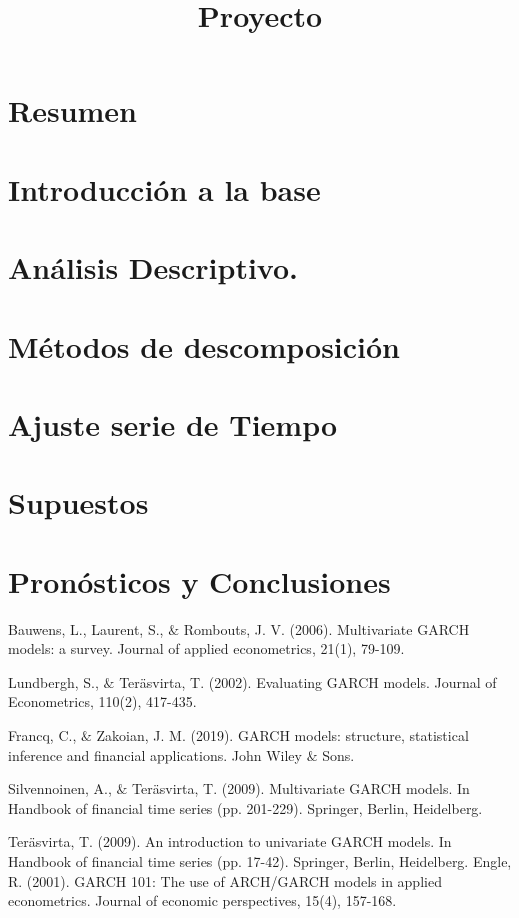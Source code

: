 \documentclass{article}
\title{Proyecto}
\begin{document}

\tableofcontents
\newpage

\section{Resumen}


\section{Introducción a la base}


\newpage

\section{Análisis Descriptivo.}



\section{Métodos de descomposición}



\section{Ajuste serie de Tiempo}



\section{Supuestos}


\section{Pronósticos y Conclusiones}



\begin{thebibliography}{X }
Bauwens, L., Laurent, S., $\&$ Rombouts, J. V. (2006). Multivariate GARCH models: a survey. Journal of applied econometrics, 21(1), 79-109.

 Lundbergh, S., $\&$ Teräsvirta, T. (2002). Evaluating GARCH models. Journal of Econometrics, 110(2), 417-435.

Francq, C., $\&$ Zakoian, J. M. (2019). GARCH models: structure, statistical inference and financial applications. John Wiley $\&$ Sons.

Silvennoinen, A., $\&$ Teräsvirta, T. (2009). Multivariate GARCH models. In Handbook of financial time series (pp. 201-229). Springer, Berlin, Heidelberg.

Teräsvirta, T. (2009). An introduction to univariate GARCH models. In Handbook of financial time series (pp. 17-42). Springer, Berlin, Heidelberg.
Engle, R. (2001). GARCH 101: The use of ARCH/GARCH models in applied econometrics. Journal of economic perspectives, 15(4), 157-168.

\end{thebibliography}
\end{document}
